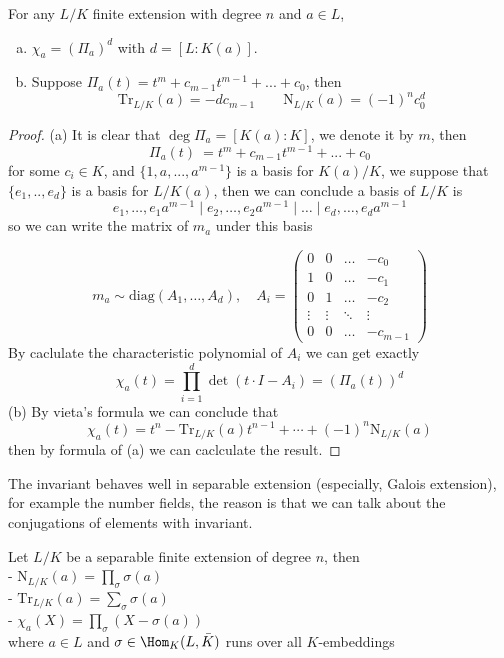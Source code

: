 \begin{colorproposition}
  For any \(L/K\) finite extension with degree \(n\) and \(a \in L\),
  \begin{enumerate}[(a)]
    \item \(\chi_a = (\Pi_a)^d\) with \(d = [L:K(a)]\).
    \item Suppose \(\Pi_a(t) = t^m + c_{m-1}t^{m-1}+...+c_0\), then \[\mathrm{Tr}_{L/K}(a) = -dc_{m-1} \qquad \mathrm{N}_{L/K}(a) = (-1)^{n}c_0^d\]
  \end{enumerate}
\end{colorproposition}

\begin{proof}
  (a) It is clear that \(\deg \Pi_a = [K(a):K]\), we denote it by \(m\), then 
  \[\Pi_a(t)\ = t^m + c_{m-1}t^{m-1}+...+c_0\]
  for some \(c_i \in K\), and \(\{1,a,...,a^{m-1}\}\) is a basis for \(K(a)/K\), we suppose that \(\{e_1,..,e_d\}\) is a basis for \(L/K(a)\), then we can conclude a basis of \(L/K\) is
  \[e_1,\dots,e_1a^{m-1} \mid e_2,\dots,e_2a^{m-1} \mid \dots \mid e_{d},\dots,e_da^{m-1}\]
  so we can write the matrix of \(m_a\) under this basis
  
  \[m_a \sim \mathrm{diag}(A_1,\dots,A_d), \quad A_i = \begin{pmatrix}
    0 & 0 & \dots & -c_0 \\
    1 & 0 & \dots & -c_1 \\
    0 & 1 & \dots & -c_2 \\
    \vdots & \vdots & \ddots & \vdots \\
    0 & 0 & \dots & -c_{m-1}
  \end{pmatrix}\]
  By caclulate the characteristic polynomial of \(A_i\) we can get exactly
  \[\chi_a(t) = \prod_{i = 1}^d \det(t\cdot I- A_i) = (\Pi_a(t))^d\]
  (b) By vieta's formula we can conclude that
  \[\chi_a(t) = t^{n} - \mathrm{Tr}_{L/K}(a)t^{n-1} + \cdots + (-1)^n\mathrm{N}_{L/K}(a)\]
  then by formula of (a) we can caclculate the result.
\end{proof}

The invariant behaves well in separable extension (especially, Galois extension), for example the number fields, the reason is that we can talk about the conjugations of elements with invariant.

\begin{colorproposition} \label{tracenormformule}
  Let \(L/K\) be a separable finite extension of degree \(n\), then \\

  - \(\mathrm{N}_{L/K}(a) = \prod_{\sigma} \sigma(a)\) \\

  - \(\mathrm{Tr}_{L/K}(a) = \sum_{\sigma} \sigma(a)\)\\

  - \(\chi_a(X) = \prod_{\sigma} (X - \sigma(a))\)\\
  where \(a \in L\) and \(\sigma \in \Hom_K(L,\bar{K})\) runs over all \(K\)-embeddings
\end{colorproposition}


